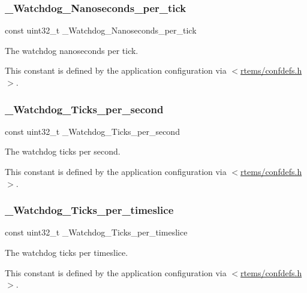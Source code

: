 \subsubsection{\texorpdfstring{\_Watchdog\_Nanoseconds\_per\_tick}{\_Watchdog\_Nanoseconds\_per\_tick}}
{\footnotesize\ttfamily const uint32\+\_\+t \+\_\+\+Watchdog\+\_\+\+Nanoseconds\+\_\+per\+\_\+tick}



The watchdog nanoseconds per tick. 

This constant is defined by the application configuration via $<$\mbox{\hyperlink{confdefs_8h}{rtems/confdefs.\+h}}$>$. \mbox{\label{group__RTEMSScoreWatchdog_ga637504d63c75c4648a19dd000b8326b8}} 
\subsubsection{\texorpdfstring{\_Watchdog\_Ticks\_per\_second}{\_Watchdog\_Ticks\_per\_second}}
{\footnotesize\ttfamily const uint32\+\_\+t \+\_\+\+Watchdog\+\_\+\+Ticks\+\_\+per\+\_\+second}



The watchdog ticks per second. 

This constant is defined by the application configuration via $<$\mbox{\hyperlink{confdefs_8h}{rtems/confdefs.\+h}}$>$. \mbox{\label{group__RTEMSScoreWatchdog_gab73f9a1a0c163bf4c5625597a237e9d2}} 
\subsubsection{\texorpdfstring{\_Watchdog\_Ticks\_per\_timeslice}{\_Watchdog\_Ticks\_per\_timeslice}}
{\footnotesize\ttfamily const uint32\+\_\+t \+\_\+\+Watchdog\+\_\+\+Ticks\+\_\+per\+\_\+timeslice}



The watchdog ticks per timeslice. 

This constant is defined by the application configuration via $<$\mbox{\hyperlink{confdefs_8h}{rtems/confdefs.\+h}}$>$. \mbox{\label{group__RTEMSScoreWatchdog_ga052d69f775d0a41629e2f561025123cb}} 

